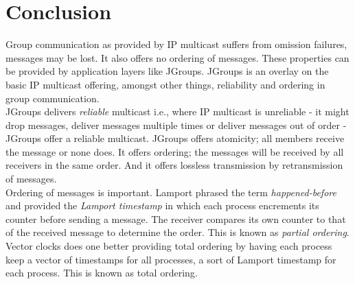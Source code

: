 \begin{comment}
In JGroups the channel abstraction is the group membership itself. When connecting to a channel a process joins the group. A Message abstraction is the means be which a process sends a message to the group. the Message consists of a receiver address (a group), a sender address and a message. 
\end{comment}  


\section{Conclusion}
\label{jgroup_conclusion}
Group communication as provided by IP multicast suffers from omission failures, messages may be lost. It also offers no ordering of messages. These properties can be provided by application layers like JGroups. JGroups is an overlay on the basic IP multicast offering, amongst other things, reliability and ordering in group communication. \\

JGroups delivers \emph{reliable} multicast i.e., where IP multicast is unreliable - it might drop messages, deliver messages multiple times or deliver messages out of order - JGroups offer a reliable multicast. JGroups offers atomicity; all members receive the message or none does. It offers ordering; the messages will be received by all receivers in the same order. And it offers lossless transmission by retransmission of messages.\\

Ordering of messages is important. Lamport phrased the term \emph{happened-before} and provided the \emph{Lamport timestamp} in which each process encrements its counter before sending a message. The receiver compares its own counter to that of the received message to determine the order. This is known as \emph{partial ordering}.\\

Vector clocks does one better providing total ordering by having each process keep a vector of timestamps for all processes, a sort of Lamport timestamp for each process. This is known as total ordering. \\




